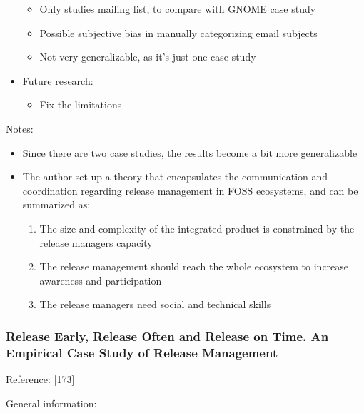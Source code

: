 \documentclass[]{book}
\providecommand{\tightlist}{%
  \setlength{\itemsep}{0pt}\setlength{\parskip}{0pt}}
\begin{document}
\begin{itemize}
  \begin{itemize}
  \tightlist
  \item
    Only studies mailing list, to compare with GNOME case study
  \item
    Possible subjective bias in manually categorizing email subjects
  \item
    Not very generalizable, as it's just one case study
  \end{itemize}
\item
  Future research:

  \begin{itemize}
  \tightlist
  \item
    Fix the limitations
  \end{itemize}
\end{itemize}

Notes:

\begin{itemize}
\tightlist
\item
  Since there are two case studies, the results become a bit more
  generalizable
\item
  The author set up a theory that encapsulates the communication and
  coordination regarding release management in FOSS ecosystems, and can
  be summarized as:

  \begin{enumerate}
  \def\labelenumi{\arabic{enumi}.}
  \tightlist
  \item
    The size and complexity of the integrated product is constrained by
    the release managers capacity
  \item
    The release management should reach the whole ecosystem to increase
    awareness and participation
  \item
    The release managers need social and technical skills
  \end{enumerate}
\end{itemize}

\subsubsection{Release Early, Release Often and Release on Time. An
Empirical Case Study of Release
Management}\label{release-early-release-often-and-release-on-time.-an-empirical-case-study-of-release-management}

Reference: {[}\protect\hyperlink{ref-teixeira2017a}{173}{]}

General information:
\end{document}

